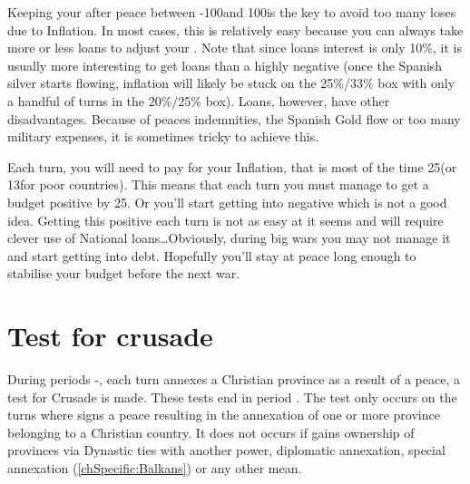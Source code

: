 \begin{playtip}
  Keeping your \RT after peace between -100\ducats and 100\ducats is the key
  to avoid too many loses due to Inflation. In most cases, this is relatively
  easy because you can always take more or less loans to adjust your \RT. Note
  that since loans interest is only 10\%, it is usually more interesting to
  get loans than a highly negative \RT (once the Spanish silver starts
  flowing, inflation will likely be stuck on the 25\%/33\% box with only a
  handful of turns in the 20\%/25\% box). Loans, however, have other
  disadvantages. Because of peaces indemnities, the Spanish Gold flow or too
  many military expenses, it is sometimes tricky to achieve this.

  Each turn, you will need to pay for your Inflation, that is most of the time
  25\ducats (or 13\ducats for poor countries). This means that each turn you
  must manage to get a budget positive by 25\ducats. Or you'll start getting
  into negative \RT which is not a good idea. Getting this positive each turn
  is not as easy at it seems and will require clever use of National
  loans\ldots Obviously, during big wars you may not manage it and start
  getting into debt. Hopefully you'll stay at peace long enough to stabilise
  your budget before the next war.
\end{playtip}

\section{Test for crusade}\label{chPeace:Crusade}
\aparag During periods -, each turn \TUR annexes a
Christian province as a result of a peace, a test for Crusade is made.
\bparag These tests end in period .
\bparag The test only occurs on the turns where \TUR signs a peace resulting
in the annexation of one or more province belonging to a Christian country. It
does not occurs if \TUR gains ownership of provinces via Dynastic ties with
another power, diplomatic annexation, special \regionBalkans annexation
(\ref{chSpecific:Balkans}) or any other mean.

